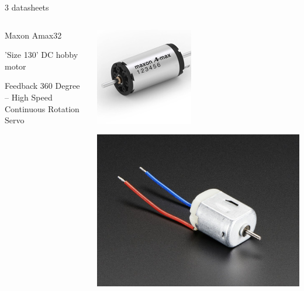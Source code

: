 \documentclass[compress]{beamer}
\begin{document}
\begin{frame}{3 datasheets}

    \begin{columns}
        \begin{column}{0.5\linewidth}
            Maxon Amax32


            \vspace{2em}


            'Size 130' DC hobby motor


            \vspace{2em}

            Feedback 360 Degree -- High Speed Continuous Rotation Servo

        \end{column}
        \begin{column}{0.5\linewidth}

            \begin{center}
                \includegraphics[height=0.3\paperheight]{maxon-amax32}

                \includegraphics[height=0.22\paperheight]{size130-dc-hobby-motor}


\end{center}
\end{column}
\end{columns}
\end{frame}
\end{document}
